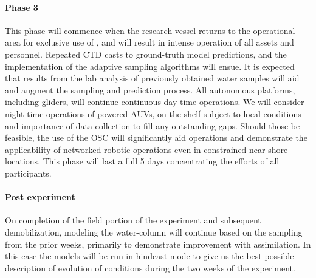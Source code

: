 \paragraph{Phase 3} This phase will commence when the research vessel
returns to the \naz operational area for exclusive use of \proje, and
will result in intense operation of all assets and personnel. Repeated
CTD casts to ground-truth model predictions, and the implementation of
the adaptive sampling algorithms will ensue. It is expected that
results from the lab analysis of previously obtained water samples
will aid and augment the sampling and prediction process. All
autonomous platforms, including gliders, will continue continuous
day-time operations. We will consider night-time operations of powered
AUVs, on the shelf subject to local conditions and importance of data
collection to fill any outstanding gaps. Should those be feasible, the
use of the OSC will significantly aid operations and demonstrate the
applicability of networked robotic operations even in constrained
near-shore locations.  This phase will last a full 5 days
concentrating the efforts of all participants.

\paragraph{Post experiment} On completion of the field portion of the
experiment and subsequent demobilization, modeling the water-column
will continue based on the sampling from the prior weeks, primarily to
demonstrate improvement with assimilation. In this case the models
will be run in hindcast mode to give us the best possible description
of evolution of conditions during the two weeks of the experiment.


